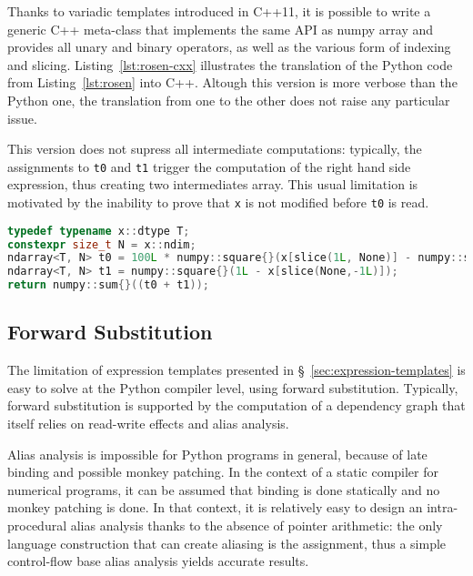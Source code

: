\documentclass[10pt, preprint]{sigplanconf}
\begin{document}
Thanks to variadic templates introduced in C++11, it is possible to write a
generic C++ meta-class that implements the same API as numpy array and provides
all unary and binary operators, as well as the various form of indexing and
slicing. Listing~\ref{lst:rosen-cxx} illustrates the translation of the Python
code from Listing~\ref{lst:rosen} into C++. Altough this version is more
verbose than the Python one, the translation from one to the other does not
raise any particular issue.

This version does not supress all intermediate computations: typically, the
assignments to \texttt{t0} and \texttt{t1} trigger the computation of the right
hand side expression, thus creating two intermediates array. This usual
limitation is motivated by the inability to prove that \texttt{x} is not
modified before \texttt{t0} is read.

\begin{lstlisting}[language=c++, caption={C++11 translated version of Python version for the rosenbrock kernel.}, label={lst:rosen-cxx}, breaklines=true]
typedef typename x::dtype T;
constexpr size_t N = x::ndim;
ndarray<T, N> t0 = 100L * numpy::square{}(x[slice(1L, None)] - numpy::square{}(x[slice(None,-1L)]));
ndarray<T, N> t1 = numpy::square{}(1L - x[slice(None,-1L)]);
return numpy::sum{}((t0 + t1));
\end{lstlisting}

\subsection{Forward Substitution}

The limitation of expression templates presented in
\S~\ref{sec:expression-templates} is easy to solve at the Python compiler
level, using forward substitution. Typically, forward substitution is
supported by the computation of a dependency graph that itself relies on
read-write effects and alias analysis.

Alias analysis is impossible for Python programs in general, because of late
binding and possible monkey patching. In the context of a static compiler for
numerical programs, it can be assumed that binding is done statically and no
monkey patching is done.  In that context, it is relatively easy to design an
intra-procedural alias analysis thanks to the absence of pointer arithmetic:
the only language construction that can create aliasing is the assignment, thus
a simple control-flow base alias analysis yields accurate results.
\end{document}
